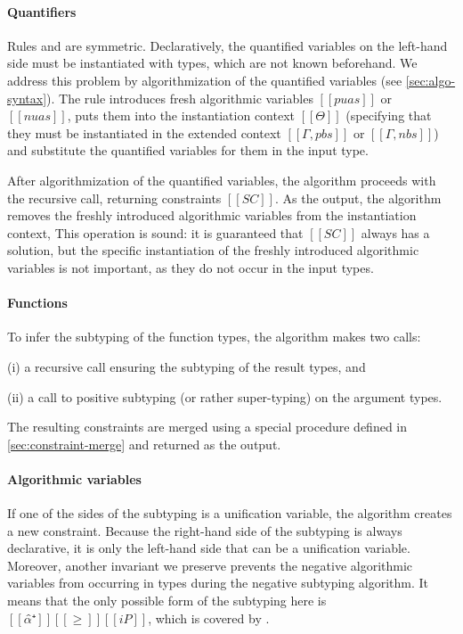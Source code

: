 \paragraph*{Quantifiers}  
Rules  and 
 are symmetric. 
Declaratively, the quantified variables on the left-hand side must 
be instantiated with types, which are not known beforehand.
We address this problem by algorithmization 
of the quantified variables (see \cref{sec:algo-syntax}).
The rule introduces fresh algorithmic variables
$[[puas]]$ or $[[nuas]]$,
puts them into the instantiation context $[[Θ]]$
(specifying that they must be instantiated in the extended context
$[[Γ, pbs]]$ or $[[Γ, nbs]]$) and substitute the quantified variables
for them in the input type. 

After algorithmization of the quantified variables, 
the algorithm proceeds with the recursive call, returning
constraints $[[SC]]$. As the output, the algorithm removes the freshly
introduced algorithmic variables from the instantiation context, This operation is
sound: it is guaranteed that $[[SC]]$ always has a solution, but the specific
instantiation of the freshly introduced algorithmic variables is not important,
as they do not occur in the input types.

\paragraph*{Functions}
To infer the subtyping of the function types, the algorithm
makes two calls: 
\begin{enumerate*}
  \item[(i)] a recursive call ensuring the subtyping of the result types, and
  \item[(ii)] a call to positive subtyping (or rather super-typing) on the argument types.
\end{enumerate*}
The resulting constraints are merged
using a special procedure defined in \cref{sec:constraint-merge}
and returned as the output.

\paragraph*{Algorithmic variables}
If one of the sides of the subtyping is a unification variable, the algorithm
creates a new constraint. Because the right-hand side of the subtyping is always
declarative, it is only the left-hand side that can be a unification variable.
Moreover, another invariant we preserve prevents the negative algorithmic
variables from occurring in types during the negative subtyping algorithm. It
means that the only possible form of the subtyping here is $[[α̂⁺]] [[≥]]
[[iP]]$, which is covered by .

